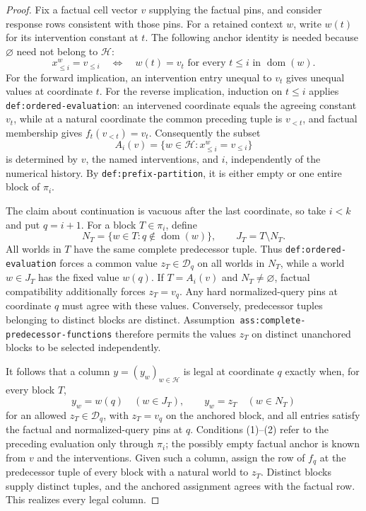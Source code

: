 \documentclass{article}
\begin{document}
\begin{proof}
Fix a factual cell vector \(v\) supplying the factual pins, and consider response rows consistent with those pins. For a retained context \(w\), write \(w(t)\) for its intervention constant at \(t\). The following anchor identity is needed because \(\varnothing\) need not belong to \(\mathcal H\):
\[
 x^w_{\leq i}=v_{\leq i}
 \quad\Longleftrightarrow\quad
 w(t)=v_t\text{ for every }t\leq i\text{ in }\operatorname{dom}(w).
 \tag{1}
\]
For the forward implication, an intervention entry unequal to \(v_t\) gives unequal values at coordinate \(t\). For the reverse implication, induction on \(t\leq i\) applies \texttt{def:ordered-evaluation}: an intervened coordinate equals the agreeing constant \(v_t\), while at a natural coordinate the common preceding tuple is \(v_{<t}\), and factual membership gives \(f_t(v_{<t})=v_t\). Consequently the subset
\[
 A_i(v)=\{w\in\mathcal H:x^w_{\leq i}=v_{\leq i}\}
\]
is determined by \(v\), the named interventions, and \(i\), independently of the numerical history. By \texttt{def:prefix-partition}, it is either empty or one entire block of \(\pi_i\).

The claim about continuation is vacuous after the last coordinate, so take \(i<k\) and put \(q=i+1\). For a block \(T\in\pi_i\), define
\[
 N_T=\{w\in T:q\notin\operatorname{dom}(w)\},
 \qquad
 J_T=T\setminus N_T.
\]
All worlds in \(T\) have the same complete predecessor tuple. Thus \texttt{def:ordered-evaluation} forces a common value \(z_T\in\mathcal D_q\) on all worlds in \(N_T\), while a world \(w\in J_T\) has the fixed value \(w(q)\). If \(T=A_i(v)\) and \(N_T\neq\varnothing\), factual compatibility additionally forces \(z_T=v_q\). Any hard normalized-query pins at coordinate \(q\) must agree with these values. Conversely, predecessor tuples belonging to distinct blocks are distinct. Assumption~\texttt{ass:complete-predecessor-functions} therefore permits the values \(z_T\) on distinct unanchored blocks to be selected independently.

It follows that a column \(y=(y_w)_{w\in\mathcal H}\) is legal at coordinate \(q\) exactly when, for every block \(T\),
\[
 y_w=w(q)\quad(w\in J_T),
 \qquad
 y_w=z_T\quad(w\in N_T)
 \tag{2}
\]
for an allowed \(z_T\in\mathcal D_q\), with \(z_T=v_q\) on the anchored block, and all entries satisfy the factual and normalized-query pins at \(q\). Conditions (1)--(2) refer to the preceding evaluation only through \(\pi_i\); the possibly empty factual anchor is known from \(v\) and the interventions. Given such a column, assign the row of \(f_q\) at the predecessor tuple of every block with a natural world to \(z_T\). Distinct blocks supply distinct tuples, and the anchored assignment agrees with the factual row. This realizes every legal column.


\end{proof}
\end{document}
